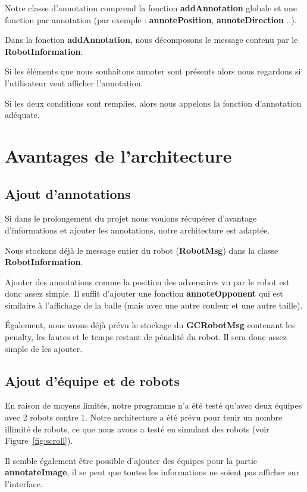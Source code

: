 Notre classe d'annotation comprend la fonction
\textbf{addAnnotation} globale et une fonction par annotation 
(par exemple : \textbf{annotePosition}, 
\textbf{annoteDirection} ..).
\bigskip


Dans la fonction \textbf{addAnnotation}, nous décomposons le 
message contenu par le \textbf{RobotInformation}.


Si les éléments que nous souhaitons annoter sont présents 
alors nous regardons si l'utilisateur veut afficher 
l'annotation.


Si les deux conditions sont remplies, alors nous appelons la 
fonction d'annotation adéquate. 

\section{Avantages de l'architecture}

\subsection{Ajout d'annotations}
Si dans le prolongement du projet nous voulons récupérer 
d'avantage d'informations et ajouter les annotations, notre 
architecture est adaptée.

Nous stockons déjà le message entier du robot 
(\textbf{RobotMsg}) dans la classe \textbf{RobotInformation}.
\bigskip

Ajouter des annotations comme la position des adversaires vu 
par le robot est donc assez simple. Il suffit d'ajouter une 
fonction \textbf{annoteOpponent} qui est similaire à 
l'affichage de la balle (mais avec une autre couleur et une 
autre taille).
\bigskip

Également, nous avons déjà prévu le stockage du 
\textbf{GCRobotMsg} contenant les penalty, les fautes et le 
temps restant de pénalité du robot. Il sera donc assez simple 
de les ajouter.
\bigskip

\subsection{Ajout d'équipe et de robots}
En raison de moyens limités, notre programme n'a été testé 
qu'avec deux équipes avec 2 robots contre 1. Notre 
architecture a été prévu pour tenir un nombre illimité de 
robots, ce que nous avons a testé en simulant des robots (voir
Figure~\ref{fig:scroll}).
\bigskip

 Il semble également être possible d'ajouter des équipes pour 
 la partie \textbf{annotateImage}, il se peut que toutes les 
 informations ne soient pas afficher sur l'interface.
 

